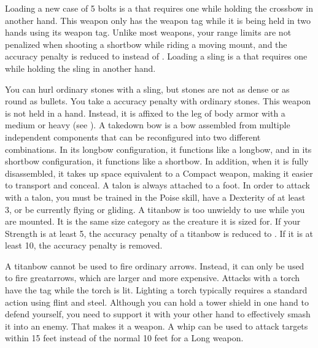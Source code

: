     Loading a new case of 5 bolts is a  that requires one  while holding the crossbow in another hand.
     This weapon only has the  weapon tag while it is being held in two hands using its  weapon tag.
     Unlike most  weapons, your range limits are not penalized when shooting a shortbow while riding a moving mount, and the accuracy penalty is reduced to  instead of .
     Loading a sling is a  that requires one  while holding the sling in another hand.
    \par You can hurl ordinary stones with a sling, but stones are not as dense or as round as bullets. You take a  accuracy penalty with ordinary stones.
     This weapon is not held in a hand.
    Instead, it is affixed to the leg of body armor with a medium or heavy  (see ).
     A takedown bow is a bow assembled from multiple independent components that can be reconfigured into two different combinations.
    In its longbow configuration, it functions like a longbow, and in its shortbow configuration, it functions like a shortbow.
    In addition, when it is fully disassembled, it takes up space equivalent to a Compact weapon, making it easier to transport and conceal.
     A talon is always attached to a foot.
    In order to attack with a talon, you must be trained in the Poise skill, have a Dexterity of at least 3, or be currently flying or gliding.
     A titanbow is too unwieldy to use while you are mounted.
    It is the same size category as the creature it is sized for.
    If your Strength is at least 5, the accuracy penalty of a titanbow is reduced to .
    If it is at least 10, the accuracy penalty is removed.

    A titanbow cannot be used to fire ordinary arrows.
    Instead, it can only be used to fire greatarrows, which are larger and more expensive.
     Attacks with a torch have the \atFire tag while the torch is lit.
    Lighting a torch typically requires a standard action using flint and steel.
     Although you can hold a tower shield in one hand to defend yourself, you need to support it with your other hand to effectively smash it into an enemy.
    That makes it a  weapon.
     A whip can be used to attack targets within 15 feet instead of the normal 10 feet for a Long weapon.

